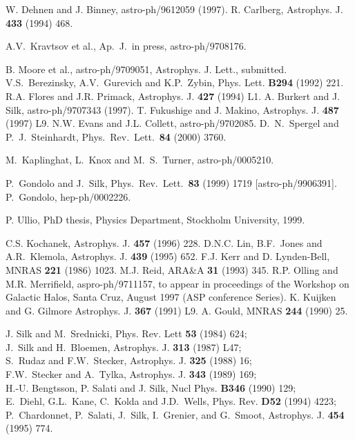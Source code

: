 \begin{thebibliography}{99}
 W. Dehnen and J. Binney, astro-ph/9612059 (1997).
 R. Carlberg, Astrophys. J. {\bf 433} (1994) 468.

 A.V.~Kravtsov et al., Ap.\ J.\ in press, astro-ph/9708176.

 B. Moore et al., astro-ph/9709051, Astrophys. J. Lett.,
submitted.
 V.S.~Berezinsky, A.V.~Gurevich and K.P.~Zybin,
Phys. Lett. {\bf B294} (1992) 221.
 R.A. Flores and J.R. Primack, Astrophys. J. {\bf 427} (1994)
L1.
 A. Burkert and J. Silk, astro-ph/9707343 (1997).
 T. Fukushige and J. Makino, Astrophys. J. {\bf 487} (1997) L9.
N.W. Evans and J.L. Collett, astro-ph/9702085.
D.~N.~Spergel and P.~J.~Steinhardt,
Phys.\ Rev.\ Lett.\  {\bf 84} (2000) 3760.

M.~Kaplinghat, L.~Knox and M.~S.~Turner,
astro-ph/0005210.

P.~Gondolo and J.~Silk,
Phys.\ Rev.\ Lett.\  {\bf 83} (1999) 1719
[astro-ph/9906391].
P.~Gondolo,
hep-ph/0002226.

 P. Ullio, PhD thesis, Physics Department,
Stockholm University, 1999.

 C.S. Kochanek, Astrophys. J. {\bf 457} (1996) 228.
 D.N.C. Lin, B.F.~Jones and A.R.~Klemola, Astrophys. J.
{\bf 439} (1995) 652.
 F.J. Kerr and D. Lynden-Bell, MNRAS {\bf 221} (1986) 1023.
 M.J. Reid, ARA\&A {\bf 31} (1993) 345.
 R.P. Olling and M.R. Merrifield, aspro-ph/9711157, to 
appear in proceedings of the Workshop on Galactic Halos, Santa Cruz, 
August 1997 (ASP conference Series).
 K. Kuijken and G. Gilmore Astrophys. J. {\bf 367} (1991) L9.
 A. Gould, MNRAS {\bf 244} (1990) 25.


J. Silk and M.~Srednicki, Phys. Rev. Lett {\bf 53} (1984) 624;\\
J.~Silk and H.~Bloemen, Astrophys. J. {\bf 313} (1987) L47;\\
S.~Rudaz and F.W.~Stecker, Astrophys. J. {\bf 325} (1988) 16;\\
F.W.~Stecker and A.~Tylka, Astrophys. J. {\bf 343} (1989) 169;\\
H.-U. Bengtsson, P. Salati and J. Silk, Nucl Phys.
{\bf B346} (1990) 129;\\
E.~Diehl, G.L.~Kane, C.~Kolda and J.D.~Wells, Phys. Rev. {\bf D52} (1994) 
4223;\\
P.~Chardonnet, P.~Salati, J.~Silk, I.~Grenier, and G.~Smoot,
Astrophys. J. {\bf 454} (1995) 774.


\end{thebibliography}
